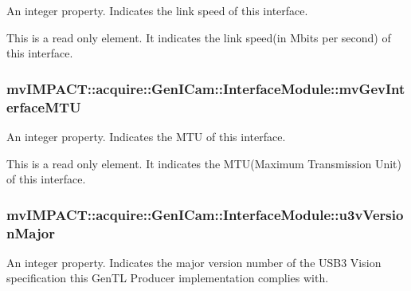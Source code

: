 An integer property. Indicates the link speed of this interface. 

This is a read only element. It indicates the link speed(in Mbits per second) of this interface. \hypertarget{classmv_i_m_p_a_c_t_1_1acquire_1_1_gen_i_cam_1_1_interface_module_a1866ed99420adc65f2280ba004697513}{
\subsubsection[{mv\+Gev\+Interface\+M\+T\+U}]{ mv\+I\+M\+P\+A\+C\+T\+::acquire\+::\+Gen\+I\+Cam\+::\+Interface\+Module\+::mv\+Gev\+Interface\+M\+T\+U}}\label{classmv_i_m_p_a_c_t_1_1acquire_1_1_gen_i_cam_1_1_interface_module_a1866ed99420adc65f2280ba004697513}


An integer property. Indicates the M\+T\+U of this interface. 

This is a read only element. It indicates the M\+T\+U(\+Maximum Transmission Unit) of this interface. \hypertarget{classmv_i_m_p_a_c_t_1_1acquire_1_1_gen_i_cam_1_1_interface_module_a460a7882c3ca2190477690c79134f58b}{
\subsubsection[{u3v\+Version\+Major}]{ mv\+I\+M\+P\+A\+C\+T\+::acquire\+::\+Gen\+I\+Cam\+::\+Interface\+Module\+::u3v\+Version\+Major}}\label{classmv_i_m_p_a_c_t_1_1acquire_1_1_gen_i_cam_1_1_interface_module_a460a7882c3ca2190477690c79134f58b}


An integer property. Indicates the major version number of the U\+S\+B3 Vision specification this Gen\+T\+L Producer implementation complies with. 

